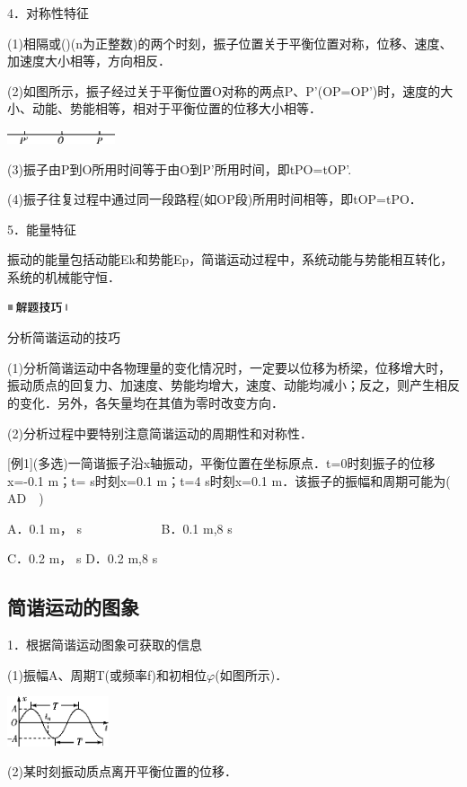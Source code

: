 4．对称性特征

(1)相隔或()(n为正整数)的两个时刻，振子位置关于平衡位置对称，位移、速度、加速度大小相等，方向相反．

(2)如图所示，振子经过关于平衡位置O对称的两点P、P'(OP=OP')时，速度的大小、动能、势能相等，相对于平衡位置的位移大小相等．

\begin{center}\includegraphics[width=1.25486in,height=0.14167in]{media/image515.png}\end{center}
(3)振子由P到O所用时间等于由O到P'所用时间，即tPO=tOP'.　

(4)振子往复过程中通过同一段路程(如OP段)所用时间相等，即tOP=tPO．

5．能量特征

振动的能量包括动能Ek和势能Ep，简谐运动过程中，系统动能与势能相互转化，系统的机械能守恒．

\begin{center}\includegraphics[width=0.70764in,height=0.12292in]{media/image37.png}\end{center}
分析简谐运动的技巧

(1)分析简谐运动中各物理量的变化情况时，一定要以位移为桥梁，位移增大时，振动质点的回复力、加速度、势能均增大，速度、动能均减小；反之，则产生相反的变化．另外，各矢量均在其值为零时改变方向．

(2)分析过程中要特别注意简谐运动的周期性和对称性．

{[}例1{]}(多选)一简谐振子沿x轴振动，平衡位置在坐标原点．t=0时刻振子的位移x=-0.1
m；t= s时刻x=0.1 m；t=4 s时刻x=0.1
m．该振子的振幅和周期可能为(　AD　)

A．0.1 m， s　　　　　　 B．0.1 m,8 s

C．0.2 m， s D．0.2 m,8 s

\subsection{简谐运动的图象}

1．根据简谐运动图象可获取的信息

(1)振幅A、周期T(或频率f)和初相位$\varphi$(如图所示)．

\begin{center}\includegraphics[width=1.17917in,height=0.57569in]{media/image516.png}\end{center}
(2)某时刻振动质点离开平衡位置的位移．

